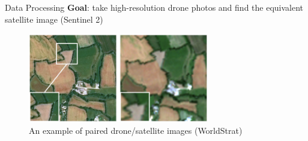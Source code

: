 \begin{frame}{Data Processing}
    \textbf{Goal}: take high-resolution drone photos and find the equivalent satellite image (Sentinel 2)
    \centering
    \begin{figure}
        \includegraphics[height=0.7\textheight,width=0.7\textwidth,keepaspectratio]{images/mm_2.png}
        \caption{An example of paired drone/satellite images (WorldStrat)}
    \end{figure}
\end{frame}